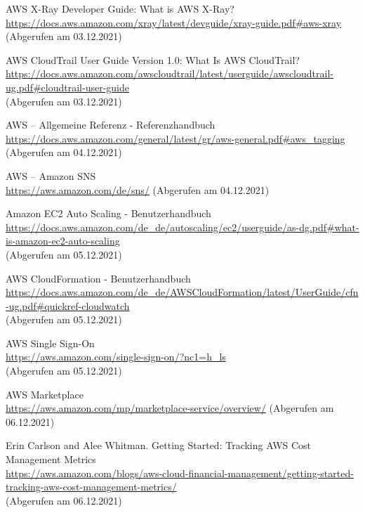 \begin{thebibliography}{HR08}
  AWS X-Ray Developer Guide: What is AWS X-Ray? \\
  \url{https://docs.aws.amazon.com/xray/latest/devguide/xray-guide.pdf#aws-xray}\\
  (Abgerufen am 03.12.2021) 
  
 AWS CloudTrail User Guide Version 1.0: What Is AWS CloudTrail?\\
  \url{https://docs.aws.amazon.com/awscloudtrail/latest/userguide/awscloudtrail-ug.pdf#cloudtrail-user-guide}\\
  (Abgerufen am 03.12.2021)

 AWS – Allgemeine Referenz - Referenzhandbuch\\
  \url{https://docs.aws.amazon.com/general/latest/gr/aws-general.pdf#aws_tagging}
  (Abgerufen am 04.12.2021)
  
   AWS – Amazon SNS\\
  \url{https://aws.amazon.com/de/sns/}
  (Abgerufen am 04.12.2021)

   Amazon EC2 Auto Scaling - Benutzerhandbuch \\
  \url{https://docs.aws.amazon.com/de_de/autoscaling/ec2/userguide/as-dg.pdf#what-is-amazon-ec2-auto-scaling}\\
  (Abgerufen am 05.12.2021)

     AWS CloudFormation - Benutzerhandbuch\\
  \url{https://docs.aws.amazon.com/de_de/AWSCloudFormation/latest/UserGuide/cfn-ug.pdf#quickref-cloudwatch}\\
  (Abgerufen am 05.12.2021)
  
   AWS Single Sign-On\\
  \url{https://aws.amazon.com/single-sign-on/?nc1=h_ls}\\
  (Abgerufen am 05.12.2021)
   
   AWS Marketplace\\
  \url{https://aws.amazon.com/mp/marketplace-service/overview/}
  (Abgerufen am 06.12.2021)
  
 Erin Carlson and Alee Whitman. Getting Started: Tracking AWS Cost Management Metrics\\
  \url{https://aws.amazon.com/blogs/aws-cloud-financial-management/getting-started-tracking-aws-cost-management-metrics/}\\
  (Abgerufen am 06.12.2021)
  


\end{thebibliography}
